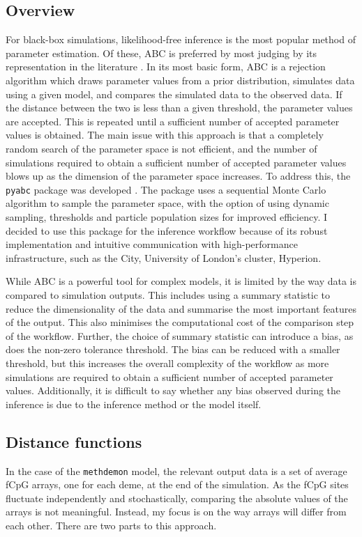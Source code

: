 \subsection{Overview}
For black-box simulations, likelihood-free inference is the most popular method
of parameter estimation. Of these, ABC is preferred by most judging by its
representation in the literature \cite{tavare_inferring_1997,
sottoriva_integrating_2010, sottoriva_big_2015, wang_calibration_2024,
bondi_approximate_2023}. In its most basic form, ABC is a rejection algorithm
which draws parameter values from a prior distribution, simulates data using a
given model, and compares the simulated data to the observed data. If the
distance between the two is less than a given threshold, the parameter values
are accepted. This is repeated until a sufficient number of accepted parameter
values is obtained. The main issue with this approach is that a completely
random search of the parameter space is not efficient, and the number of
simulations required to obtain a sufficient number of accepted parameter values
blows up as the dimension of the parameter space increases. To address this,
the \texttt{pyabc} package was developed \cite{klinger_pyabc_2018,
schalte_pyabc_2022}. The package uses a sequential Monte Carlo algorithm to
sample the parameter space, with the option of using dynamic sampling,
thresholds and particle population sizes for improved efficiency. I decided to
use this package for the inference workflow because of its robust
implementation and intuitive communication with high-performance
infrastructure, such as the City, University of London's cluster, Hyperion.\par
While ABC is a powerful tool for complex models, it is limited by the way data
is compared to simulation outputs. This includes using a summary statistic to
reduce the dimensionality of the data and summarise the most important features
of the output. This also minimises the computational cost of the comparison
step of the workflow. Further, the choice of summary statistic can introduce a
bias, as does the non-zero tolerance threshold. The bias can be reduced with a
smaller threshold, but this increases the overall complexity of the workflow as
more simulations are required to obtain a sufficient number of accepted
parameter values. Additionally, it is difficult to say whether any bias
observed during the inference is due to the inference method or the model
itself.

\subsection{Distance functions}
In the case of the \texttt{methdemon} model, the relevant output data is a set
of average fCpG arrays, one for each deme, at the end of the simulation. As the
fCpG sites fluctuate independently and stochastically, comparing the absolute
values of the arrays is not meaningful. Instead, my focus is on the way arrays
will differ from each other. There are two parts to this approach.

